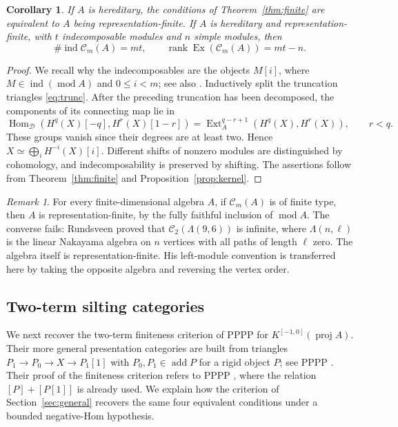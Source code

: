 \documentclass[pdflatex,sn-mathphys-num]{sn-jnl}
\numberwithin{equation}{section}
\newtheorem{corollary}[theorem]{Corollary}
\theoremstyle{definition}
\theoremstyle{remark}\newtheorem{remark}[theorem]{Remark}
\newcommand{\C}{\mathcal C}
\newcommand{\D}{\mathcal D}
\newcommand{\Hom}{\operatorname{Hom}}
\newcommand{\Ext}{\operatorname{Ext}}
\newcommand{\ind}{\operatorname{ind}}
\newcommand{\add}{\operatorname{add}}
\newcommand{\modu}{\operatorname{mod}}
\newcommand{\Ex}{\operatorname{Ex}}
\begin{document}
\begin{corollary}\label{cor:hereditary}
If $A$ is hereditary, the conditions of Theorem~\ref{thm:finite} are
equivalent to $A$ being representation-finite. If $A$ is hereditary and
representation-finite, with $t$ indecomposable modules and $n$ simple
modules, then
\[
 \#\ind\C_m(A)=mt,\qquad
 \operatorname{rank}\Ex(\C_m(A))=mt-n.
\]
\end{corollary}
\begin{proof}
We recall why the indecomposables are the objects $M[i]$, where
$M\in\ind(\modu A)$ and $0\leq i<m$; see also
\cite[Example 3.15]{Zhou}. Inductively split the truncation triangles
\eqref{eq:trunc}. After the preceding truncation has been decomposed,
the components of its connecting map lie in
\[
 \Hom_{\D}(H^q(X)[-q],H^r(X)[1-r])
 =\Ext_A^{q-r+1}(H^q(X),H^r(X)),\qquad r<q.
\]
These groups vanish since their degrees are at least two. Hence
$X\simeq\bigoplus_iH^{-i}(X)[i]$.
Different shifts of nonzero modules are distinguished by cohomology,
and indecomposability is preserved by shifting. The assertions follow
from Theorem~\ref{thm:finite} and Proposition~\ref{prop:kernel}.
\end{proof}

\begin{remark}\label{rem:notconverse}
For every finite-dimensional algebra $A$, if $\C_m(A)$ is of finite
type, then $A$ is representation-finite, by the fully faithful inclusion of
$\modu A$. The converse fails: Rundsveen
\cite[Lemma 4.11(4), Theorem 4.1]{Rundsveen} proved that
$\C_2(\Lambda(9,6))$ is infinite, where $\Lambda(n,\ell)$ is the linear
Nakayama algebra on $n$ vertices with all paths of length $\ell$ zero. The algebra itself is
representation-finite. His left-module convention is transferred here by
taking the opposite algebra and reversing the vertex order.
\end{remark}

\subsection{Two-term silting categories}
We next recover the two-term finiteness criterion of PPPP
\cite{PPPP} for
$K^{[-1,0]}(\operatorname{proj}A)$. Their more general presentation
categories are built from triangles $P_1\to P_0\to X\to P_1[1]$
with $P_0,P_1\in\add P$ for a rigid object $P$; see PPPP
\cite[Section 4.7.2]{PPPP}. Their proof of the finiteness criterion
refers to PPPP \cite[proof of Proposition 3.22]{PPPP}, where the
relation $[P]+[P[1]]$ is already used. We explain how the criterion
of Section~\ref{sec:general} recovers the same four equivalent
conditions under a bounded negative-Hom hypothesis.
\end{document}
